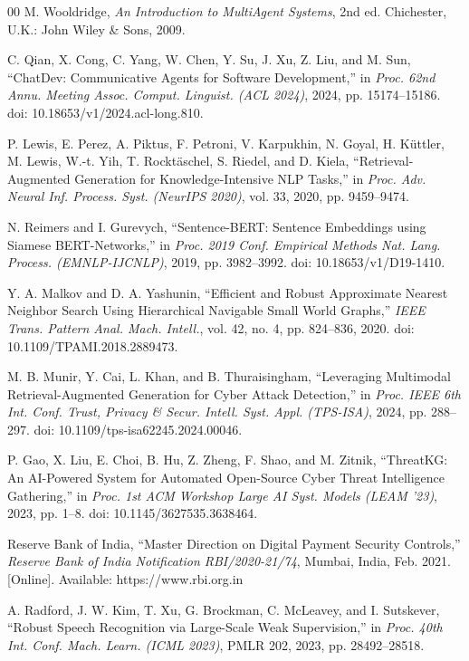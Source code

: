 \documentclass[conference]{IEEEtran}
\begin{document}
\begin{thebibliography}{00}
M. Wooldridge, \textit{An Introduction to MultiAgent Systems}, 2nd ed. Chichester, U.K.: John Wiley \& Sons, 2009.

C. Qian, X. Cong, C. Yang, W. Chen, Y. Su, J. Xu, Z. Liu, and M. Sun, ``ChatDev: Communicative Agents for Software Development,'' in \textit{Proc. 62nd Annu. Meeting Assoc. Comput. Linguist. (ACL 2024)}, 2024, pp. 15174--15186. doi: 10.18653/v1/2024.acl-long.810.

P. Lewis, E. Perez, A. Piktus, F. Petroni, V. Karpukhin, N. Goyal, H. K{\"u}ttler, M. Lewis, W.-t. Yih, T. Rockt{\"a}schel, S. Riedel, and D. Kiela, ``Retrieval-Augmented Generation for Knowledge-Intensive NLP Tasks,'' in \textit{Proc. Adv. Neural Inf. Process. Syst. (NeurIPS 2020)}, vol. 33, 2020, pp. 9459--9474.

N. Reimers and I. Gurevych, ``Sentence-BERT: Sentence Embeddings using Siamese BERT-Networks,'' in \textit{Proc. 2019 Conf. Empirical Methods Nat. Lang. Process. (EMNLP-IJCNLP)}, 2019, pp. 3982--3992. doi: 10.18653/v1/D19-1410.

Y. A. Malkov and D. A. Yashunin, ``Efficient and Robust Approximate Nearest Neighbor Search Using Hierarchical Navigable Small World Graphs,'' \textit{IEEE Trans. Pattern Anal. Mach. Intell.}, vol. 42, no. 4, pp. 824--836, 2020. doi: 10.1109/TPAMI.2018.2889473.

M. B. Munir, Y. Cai, L. Khan, and B. Thuraisingham, ``Leveraging Multimodal Retrieval-Augmented Generation for Cyber Attack Detection,'' in \textit{Proc. IEEE 6th Int. Conf. Trust, Privacy \& Secur. Intell. Syst. Appl. (TPS-ISA)}, 2024, pp. 288--297. doi: 10.1109/tps-isa62245.2024.00046.

P. Gao, X. Liu, E. Choi, B. Hu, Z. Zheng, F. Shao, and M. Zitnik, ``ThreatKG: An AI-Powered System for Automated Open-Source Cyber Threat Intelligence Gathering,'' in \textit{Proc. 1st ACM Workshop Large AI Syst. Models (LEAM '23)}, 2023, pp. 1--8. doi: 10.1145/3627535.3638464.

Reserve Bank of India, ``Master Direction on Digital Payment Security Controls,'' \textit{Reserve Bank of India Notification RBI/2020-21/74}, Mumbai, India, Feb. 2021. [Online]. Available: https://www.rbi.org.in

A. Radford, J. W. Kim, T. Xu, G. Brockman, C. McLeavey, and I. Sutskever, ``Robust Speech Recognition via Large-Scale Weak Supervision,'' in \textit{Proc. 40th Int. Conf. Mach. Learn. (ICML 2023)}, PMLR 202, 2023, pp. 28492--28518.


\end{thebibliography}
\end{document}
